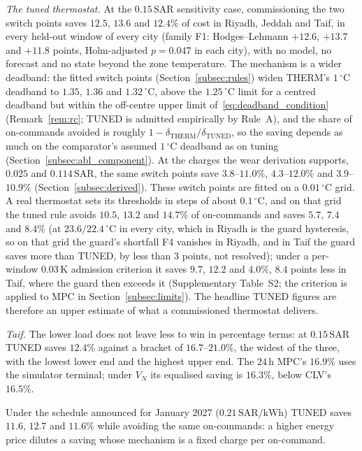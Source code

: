 \documentclass[pdflatex,sn-mathphys-num,iicol]{sn-jnl}
\theoremstyle{thmstyleone}\newtheorem{proposition}{Proposition}\newtheorem{corollary}{Corollary}
\theoremstyle{thmstyletwo}\newtheorem{remark}{Remark}\newtheorem{observation}{Observation}
\theoremstyle{thmstylethree}\newtheorem{definition}{Definition}
\newcommand{\SAR}{\text{SAR}}
\newcommand{\kWh}{\text{kWh}}
\begin{document}
\emph{The tuned thermostat.} At the $0.15\,\SAR$ sensitivity case, commissioning the two switch points saves $12.5$, $13.6$ and $12.4\%$ of cost in Riyadh, Jeddah and Taif, in every held-out window of every city (family F1: Hodges--Lehmann $+12.6$, $+13.7$ and $+11.8$ points, Holm-adjusted $p=0.047$ in each city), with no model, no forecast and no state beyond the zone temperature. The mechanism is a wider deadband: the fitted switch points (Section~\ref{subsec:rules}) widen THERM's $1\,^\circ$C deadband to $1.35$, $1.36$ and $1.32\,^\circ$C, above the $1.25\,^\circ$C limit for a centred deadband but within the off-centre upper limit of~\eqref{eq:deadband_condition} (Remark~\ref{rem:rc}; TUNED is admitted empirically by Rule~A), and the share of on-commands avoided is roughly $1-\delta_{\mathrm{THERM}}/\delta_{\mathrm{TUNED}}$, so the saving depends as much on the comparator's assumed $1\,^\circ$C deadband as on tuning (Section~\ref{subsec:abl_component}). At the charges the wear derivation supports, $0.025$ and $0.114\,\SAR$, the same switch points save $3.8$--$11.0\%$, $4.3$--$12.0\%$ and $3.9$--$10.9\%$ (Section~\ref{subsec:derived}). These switch points are fitted on a $0.01\,^\circ$C grid. A real thermostat sets its thresholds in steps of about $0.1\,^\circ$C, and on that grid the tuned rule avoids $10.5$, $13.2$ and $14.7\%$ of on-commands and saves $5.7$, $7.4$ and $8.4\%$ (at $23.6/22.4\,^\circ$C in every city, which in Riyadh is the guard hysteresis, so on that grid the guard's shortfall F4 vanishes in Riyadh, and in Taif the guard saves more than TUNED, by less than $3$ points, not resolved); under a per-window $0.03\,$K admission criterion it saves $9.7$, $12.2$ and $4.0\%$, $8.4$ points less in Taif, where the guard then exceeds it (Supplementary Table~S2; the criterion is applied to MPC in Section~\ref{subsec:limits}). The headline TUNED figures are therefore an upper estimate of what a commissioned thermostat delivers.

\emph{Taif.} The lower load does not leave less to win in percentage terms: at $0.15\,\SAR$ TUNED saves $12.4\%$ against a bracket of $16.7$--$21.0\%$, the widest of the three, with the lowest lower end and the highest upper end. The $24\,$h MPC's $16.9\%$ uses the simulator terminal; under $V_N$ its equalised saving is $16.3\%$, below CLV's $16.5\%$.

Under the schedule announced for January 2027 ($0.21\,\SAR/\kWh$) TUNED saves $11.6$, $12.7$ and $11.6\%$ while avoiding the same on-commands: a higher energy price dilutes a saving whose mechanism is a fixed charge per on-command.
\end{document}
